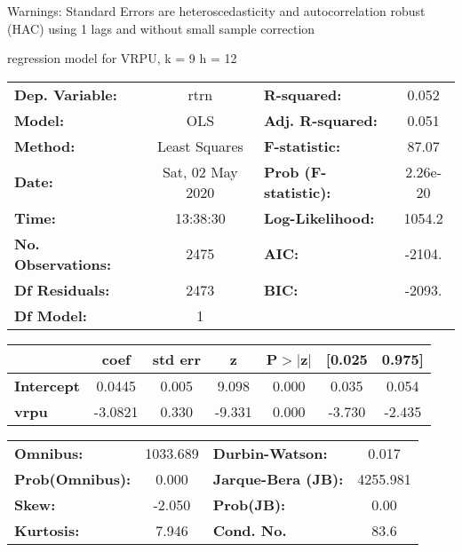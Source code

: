 Warnings: \newline
 [1] Standard Errors are heteroscedasticity and autocorrelation robust (HAC) using 1 lags and without small sample correction\ 

regression model for VRPU, k = 9 h = 12\begin{center}
\begin{tabular}{lclc}
\toprule
\textbf{Dep. Variable:}    &       rtrn       & \textbf{  R-squared:         } &     0.052   \\
\textbf{Model:}            &       OLS        & \textbf{  Adj. R-squared:    } &     0.051   \\
\textbf{Method:}           &  Least Squares   & \textbf{  F-statistic:       } &     87.07   \\
\textbf{Date:}             & Sat, 02 May 2020 & \textbf{  Prob (F-statistic):} &  2.26e-20   \\
\textbf{Time:}             &     13:38:30     & \textbf{  Log-Likelihood:    } &    1054.2   \\
\textbf{No. Observations:} &        2475      & \textbf{  AIC:               } &    -2104.   \\
\textbf{Df Residuals:}     &        2473      & \textbf{  BIC:               } &    -2093.   \\
\textbf{Df Model:}         &           1      & \textbf{                     } &             \\
\bottomrule
\end{tabular}
\begin{tabular}{lcccccc}
                   & \textbf{coef} & \textbf{std err} & \textbf{z} & \textbf{P$> |$z$|$} & \textbf{[0.025} & \textbf{0.975]}  \\
\midrule
\textbf{Intercept} &       0.0445  &        0.005     &     9.098  &         0.000        &        0.035    &        0.054     \\
\textbf{vrpu}      &      -3.0821  &        0.330     &    -9.331  &         0.000        &       -3.730    &       -2.435     \\
\bottomrule
\end{tabular}
\begin{tabular}{lclc}
\textbf{Omnibus:}       & 1033.689 & \textbf{  Durbin-Watson:     } &    0.017  \\
\textbf{Prob(Omnibus):} &   0.000  & \textbf{  Jarque-Bera (JB):  } & 4255.981  \\
\textbf{Skew:}          &  -2.050  & \textbf{  Prob(JB):          } &     0.00  \\
\textbf{Kurtosis:}      &   7.946  & \textbf{  Cond. No.          } &     83.6  \\
\bottomrule
\end{tabular}
\end{center}

